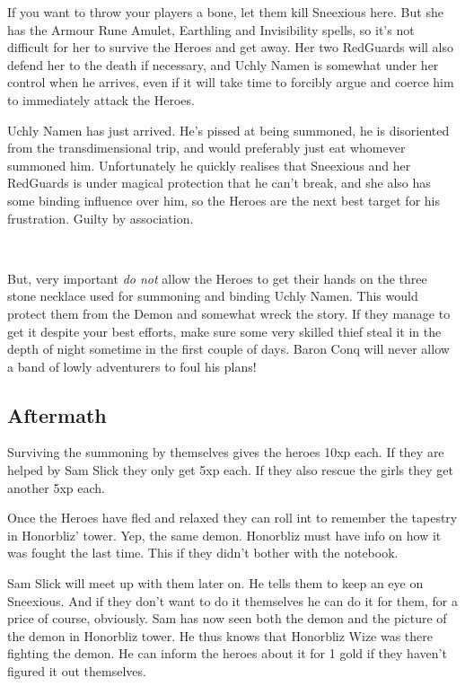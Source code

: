 If you want to throw your players a bone, let them kill Sneexious here. But she has the Armour Rune Amulet, Earthling and Invisibility spells, so it's not difficult for her to survive the Heroes and get away. Her two RedGuards will also defend her to the death if necessary, and Uchly Namen is somewhat under her control when he arrives, even if it will take time to forcibly argue and coerce him to immediately attack the Heroes.

Uchly Namen has just arrived. He's pissed at being summoned, he is disoriented from the transdimensional trip, and would preferably just eat whomever summoned him. Unfortunately he quickly realises that Sneexious and her RedGuards is under magical protection that he can't break, and she also has some binding influence over him, so the Heroes are the next best target for his frustration. Guilty by association.

\

But, very important \emph{do not} allow the Heroes to get their hands on the three stone necklace used for summoning and binding Uchly Namen. This would protect them from the Demon and somewhat wreck the story. If they manage to get it despite your best efforts, make sure some very skilled thief steal it in the depth of night sometime in the first couple of days. Baron Conq will never allow a band of lowly adventurers to foul his plans!



\subsection*{Aftermath}
Surviving the summoning by themselves gives the heroes 10xp each. If they are helped by Sam Slick they only get 5xp each. If they also rescue the girls they get another 5xp each.

Once the Heroes have fled and relaxed they can roll int to remember the tapestry in Honorbliz' tower. Yep, the same demon. Honorbliz must have info on how it was fought the last time. This if they didn't bother with the notebook.

Sam Slick will meet up with them later on. He tells them to keep an eye on Sneexious. And if they don't want to do it themselves he can do it for them, for a price of course, obviously.
Sam has now seen both the demon and the picture of the demon in Honorbliz tower. He thus knows that Honorbliz Wize was there fighting the demon. He can inform the heroes about it for 1 gold if they haven't figured it out themselves.

